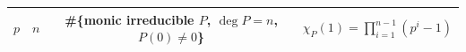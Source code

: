 \providecommand{\aqthreedata}{data/aq3/}
\footnotesize
\begin{tabular}{@{}cccc@{}}
\toprule
$p$ & $n$ & \#\{monic irreducible $P$, $\deg P=n$, $P(0)\ne0$\} &
  $\chi_P(1)=\prod_{i=1}^{n-1}(p^i-1)$\\
\midrule

\end{tabular}
